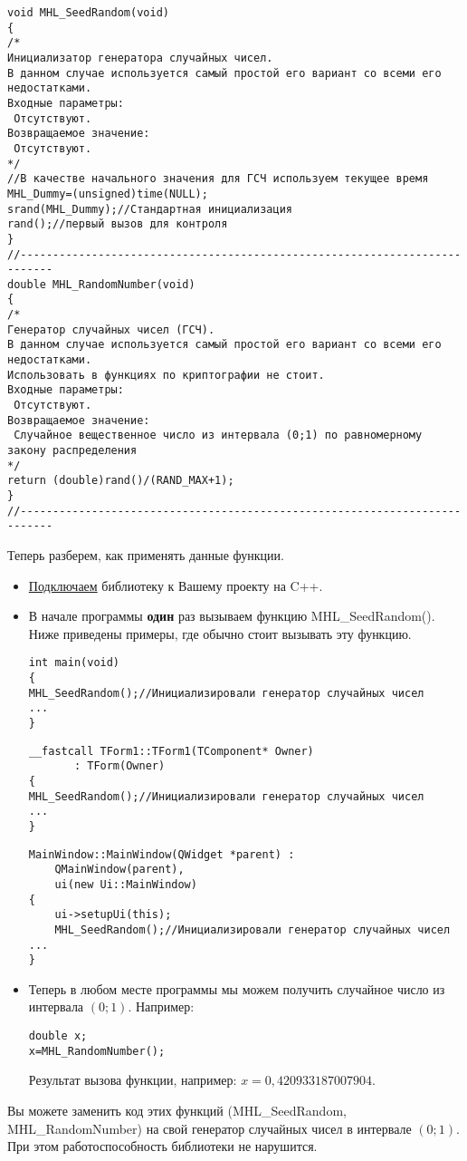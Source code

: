 \begin{lstlisting}[label=random_standard,caption=Стандартный вариант по умолчанию]
void MHL_SeedRandom(void)
{
/*
Инициализатор генератора случайных чисел.
В данном случае используется самый простой его вариант со всеми его недостатками.
Входные параметры:
 Отсутствуют.
Возвращаемое значение:
 Отсутствуют.
*/ 
//В качестве начального значения для ГСЧ используем текущее время
MHL_Dummy=(unsigned)time(NULL);
srand(MHL_Dummy);//Стандартная инициализация
rand();//первый вызов для контроля
}
//---------------------------------------------------------------------------
double MHL_RandomNumber(void)
{
/*
Генератор случайных чисел (ГСЧ).
В данном случае используется самый простой его вариант со всеми его недостатками.
Использовать в функциях по криптографии не стоит.
Входные параметры:
 Отсутствуют.
Возвращаемое значение:
 Случайное вещественное число из интервала (0;1) по равномерному закону распределения
*/ 
return (double)rand()/(RAND_MAX+1);
}
//---------------------------------------------------------------------------
\end{lstlisting}

Теперь разберем, как применять данные функции.

\begin{itemize}
\item \hyperref[section_install]{Подключаем} библиотеку к Вашему проекту на C++.
\item В начале программы \textbf{один} раз вызываем функцию MHL\_SeedRandom(). Ниже приведены примеры, где обычно стоит вызывать эту функцию.

\begin{lstlisting}[label=random_console,caption=Применение MHL\_SeedRandom для консольного приложения]
int main(void)
{
MHL_SeedRandom();//Инициализировали генератор случайных чисел
...
} 
\end{lstlisting}

\begin{lstlisting}[label=random_cbuilder,caption=Применение MHL\_SeedRandom для C++Builder]
__fastcall TForm1::TForm1(TComponent* Owner)
       : TForm(Owner)
{
MHL_SeedRandom();//Инициализировали генератор случайных чисел
...
}
\end{lstlisting}

\begin{lstlisting}[label=random_qt,caption=Применение MHL\_SeedRandom для Qt]
MainWindow::MainWindow(QWidget *parent) :
    QMainWindow(parent),
    ui(new Ui::MainWindow)
{
    ui->setupUi(this);
    MHL_SeedRandom();//Инициализировали генератор случайных чисел
...
}
\end{lstlisting}

\item Теперь в любом месте программы мы можем получить случайное число из интервала $ \left(0; 1\right)  $. Например:

\begin{lstlisting}[label=random_use,caption=Применение ГСЧ]
double x;
x=MHL_RandomNumber();
\end{lstlisting}

Результат вызова функции, например: $ x = 0,420933187007904 $.

\end{itemize}

Вы можете заменить код этих функций (MHL\_SeedRandom, MHL\_RandomNumber) на свой генератор случайных чисел в интервале $\left( 0; 1\right)$. При этом работоспособность библиотеки не нарушится.